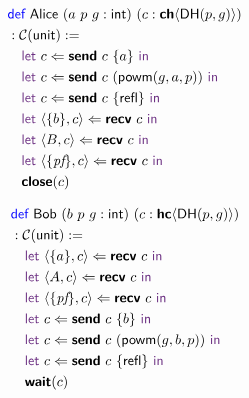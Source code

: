 \vspace{-0.4em}
\begin{center}
\begin{minipage}{0.45\textwidth}
\begingroup
\small
\addtolength{\jot}{-0.25em}
\begin{alignat*}{4}
  &\Def\ \textsf{Alice}\ (a\ p\ g: \textsf{int})\ (c : \CH{\textsf{DH}(p,g)}) \\
  &: \CM{\textsf{unit}} := \\
  &\quad\Let\ c \Leftarrow \Send\ c\ \{ a \}\ \In \\
  &\quad\Let\ c \Leftarrow \Send\ c\ (\textsf{powm}(g, a, p))\ \In \\
  &\quad\Let\ c \Leftarrow \Send\ c\ \{\textsf{refl}\}\ \In \\
  &\quad\Let\ \langle{\{b\}, c}\rangle \Leftarrow \Recv\ c\ \In \\
  &\quad\Let\ \langle{B, c}\rangle \Leftarrow \Recv\ c\ \In \\
  &\quad\Let\ \langle{\{\textit{pf}\}, c}\rangle \Leftarrow \Recv\ c\ \In \\
  &\quad\Close(c)
\end{alignat*}
\endgroup
\end{minipage}
\begin{minipage}{0.5\textwidth}
\begingroup
\small
\addtolength{\jot}{-0.25em}
\begin{alignat*}{4}
  &\Def\ \textsf{Bob}\ (b\ p\ g: \textsf{int})\ (c : \HC{\textsf{DH}(p,g)}) \\
  &: \CM{\textsf{unit}} := \\
  &\quad\Let\ \langle{\{a\}, c}\rangle \Leftarrow \Recv\ c\ \In \\
  &\quad\Let\ \langle{A, c}\rangle \Leftarrow \Recv\ c\ \In \\
  &\quad\Let\ \langle{\{\textit{pf}\}, c}\rangle \Leftarrow \Recv\ c\ \In \\
  &\quad\Let\ c \Leftarrow \Send\ c\ \{ b \}\ \In \\
  &\quad\Let\ c \Leftarrow \Send\ c\ (\textsf{powm}(g, b, p))\ \In \\
  &\quad\Let\ c \Leftarrow \Send\ c\ \{\textsf{refl}\}\ \In \\
  &\quad\Wait(c)
\end{alignat*}
\endgroup
\end{minipage}
\end{center}
\vspace{0.5em}

